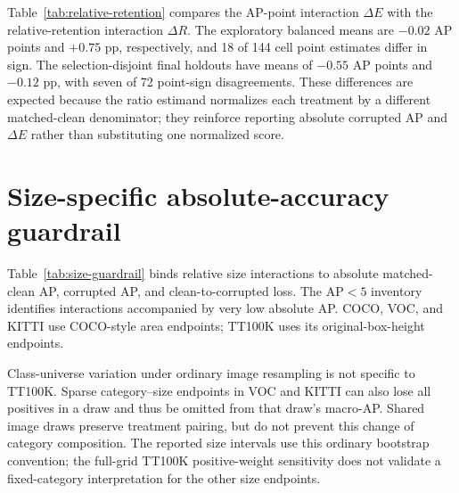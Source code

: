 \documentclass[10pt]{article}
\newcommand{\DeltaE}{\Delta E}
\newcommand{\DeltaR}{\Delta R}
\begin{document}
Table~\ref{tab:relative-retention} compares the AP-point interaction $\DeltaE$
with the relative-retention interaction $\DeltaR$. The exploratory balanced
means are $-0.02$ AP points and $+0.75$ pp, respectively, and 18 of 144 cell
point estimates differ in sign. The selection-disjoint final holdouts have means of $-0.55$
AP points and $-0.12$ pp, with seven of 72 point-sign disagreements. These
differences are expected because the ratio estimand normalizes each treatment
by a different matched-clean denominator; they reinforce reporting absolute
corrupted AP and $\DeltaE$ rather than substituting one normalized score.

\begin{table}[htbp]
\centering
\caption{Relative-retention sensitivity. Mean $\DeltaE$ is in AP points and
mean $\DeltaR$ is in percentage points (pp). Sign differences compare finite
cell point estimates, not interval decisions.}
\label{tab:relative-retention}
\small
\resizebox{0.92\textwidth}{!}{}
\end{table}

\begin{table}[htbp]
\centering
\caption{All 18 exploratory cells for which the point estimates of $\DeltaE$
and $\DeltaR$ have different signs. The seven holdout disagreements are
summarized in Table~\ref{tab:relative-retention}.}
\label{tab:relative-retention-disagreements}
\scriptsize
\resizebox{\textwidth}{!}{}
\end{table}

\FloatBarrier

\section{Size-specific absolute-accuracy guardrail}

Table~\ref{tab:size-guardrail} binds relative size interactions to absolute
matched-clean AP, corrupted AP, and clean-to-corrupted loss. The AP$<5$
inventory identifies interactions accompanied by very low absolute AP. COCO, VOC, and KITTI use COCO-style area endpoints; TT100K uses
its original-box-height endpoints.

Class-universe variation under ordinary image resampling is not specific to
TT100K. Sparse category--size endpoints in VOC and KITTI can also lose all
positives in a draw and thus be omitted from that draw's macro-AP. Shared
image draws preserve treatment pairing, but do not prevent this change of
category composition. The reported size intervals use this ordinary
bootstrap convention; the full-grid TT100K positive-weight sensitivity does
not validate a fixed-category interpretation for the other size endpoints.
\end{document}
